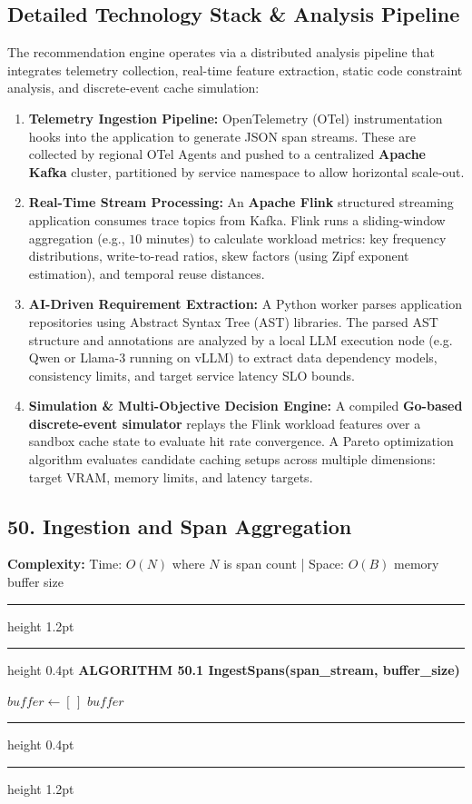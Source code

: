 \documentclass[11pt,a4paper]{article}
\newenvironment{textbookalgo}[2]{%
  \par\addvspace{1.2em}\noindent
  \hrule height 1.2pt
  \vspace{1.5pt}
  \hrule height 0.4pt
  \vspace{5pt}
  {\noindent\large\bfseries\sffamily ALGORITHM #1 \quad #2}
  \par\vspace{5pt}
  \RestyleAlgo{plain}
}{%
  \par\vspace{4pt}
  \hrule height 0.4pt
  \vspace{1.5pt}
  \hrule height 1.2pt
  \par\addvspace{1.2em}
}
\theoremstyle{definition}
\begin{document}
\subsection{Detailed Technology Stack \& Analysis Pipeline}
The recommendation engine operates via a distributed analysis pipeline that integrates telemetry collection, real-time feature extraction, static code constraint analysis, and discrete-event cache simulation:
\begin{enumerate}[leftmargin=*]
  \item \textbf{Telemetry Ingestion Pipeline:} OpenTelemetry (OTel) instrumentation hooks into the application to generate JSON span streams. These are collected by regional OTel Agents and pushed to a centralized \textbf{Apache Kafka} cluster, partitioned by service namespace to allow horizontal scale-out.
  \item \textbf{Real-Time Stream Processing:} An \textbf{Apache Flink} structured streaming application consumes trace topics from Kafka. Flink runs a sliding-window aggregation (e.g., $10$ minutes) to calculate workload metrics: key frequency distributions, write-to-read ratios, skew factors (using Zipf exponent estimation), and temporal reuse distances.
  \item \textbf{AI-Driven Requirement Extraction:} A Python worker parses application repositories using Abstract Syntax Tree (AST) libraries. The parsed AST structure and annotations are analyzed by a local LLM execution node (e.g. Qwen or Llama-3 running on vLLM) to extract data dependency models, consistency limits, and target service latency SLO bounds.
  \item \textbf{Simulation \& Multi-Objective Decision Engine:} A compiled \textbf{Go-based discrete-event simulator} replays the Flink workload features over a sandbox cache state to evaluate hit rate convergence. A Pareto optimization algorithm evaluates candidate caching setups across multiple dimensions: target VRAM, memory limits, and latency targets.
\end{enumerate}

\clearpage
\subsection{50. Ingestion and Span Aggregation}


\noindent
\textbf{Complexity:} Time: $O(N)$ where $N$ is span count | Space: $O(B)$ memory buffer size
\smallskip

\begin{textbookalgo}{50.1}{IngestSpans(span\_stream, buffer\_size)}
\begin{algorithm}[H]
$buffer \leftarrow [\,]$\;
\Return $buffer$\;
\end{algorithm}
\end{textbookalgo}
\end{document}
